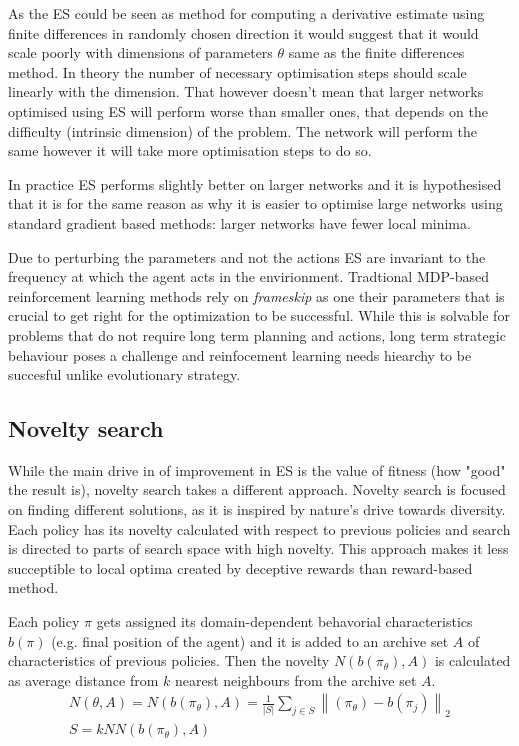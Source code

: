 As the ES could be seen as method for computing a derivative estimate using finite differences in randomly chosen direction it would suggest that it would scale poorly with dimensions of parameters $\theta$ same as the finite differences method. In theory the number of necessary optimisation steps should scale linearly with the dimension. That however doesn't mean that larger networks optimised using ES will perform worse than smaller ones, that depends on the difficulty (intrinsic dimension) of the problem. The network will perform the same however it will take more optimisation steps to do so. 

In practice ES performs slightly better on larger networks and it is hypothesised that it is for the same reason as why it is easier to optimise large networks using standard gradient based methods: larger networks have fewer local minima. 

Due to perturbing the parameters and not the actions ES are invariant to the frequency at which the agent acts in the envirionment. Tradtional MDP-based reinforcement learning methods rely on \emph{frameskip} as one their parameters that is crucial to get right for the optimization to be successful. While this is solvable for problems that do not require long term planning and actions, long term strategic behaviour poses a challenge and reinfocement learning needs hiearchy to be succesful unlike evolutionary strategy. \cite{salimans2017}


\subsection{Novelty search}

While the main drive in of improvement in ES is the value of fitness (how "good" the result is), novelty search takes a different approach. Novelty search is focused on finding different solutions, as it is inspired by nature's drive towards diversity. Each policy has its novelty calculated with respect to previous policies and search is directed to parts of search space with high novelty. This approach makes it less succeptible to local optima created by deceptive rewards than reward-based method. 

Each policy $\pi$ gets assigned its domain-dependent behavorial characteristics $b(\pi)$ (e.g. final position of the agent) and it is added to an archive set $A$ of characteristics of previous policies. Then the novelty $N(b(\pi_\theta), A)$ is calculated as average distance from $k$ nearest neighbours from the archive set $A$.
\begin{equation}
    \begin{gathered}        
    N(\theta,A) = N(b(\pi_\theta),A)=\frac{1}{\left\lvert S\right\rvert }\sum_{j\in S} \left\lVert(\pi_\theta)-b(\pi_j) \right\rVert_2  \\
    S = kNN(b(\pi_\theta),A)
\end{gathered} 
\end{equation}
